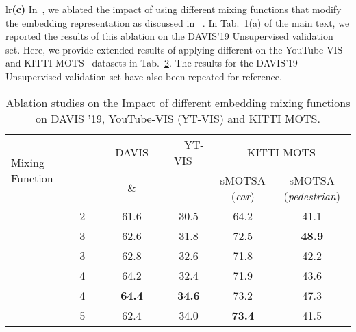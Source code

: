 \documentclass[runningheads]{llncs}
\begin{document}
\begin{table}[t]
\begin{subtable}[t]{0.36\linewidth}
{\begin{tabular}[t]{lr}{\scriptsize\textbf{(c)}}
In~\secAblations, we ablated the impact of using different mixing functions  that modify the embedding representation as discussed in ~\secEmbeddingRepresentation. In Tab.~1(a) of the main text, we reported the results of this ablation on the DAVIS'19 Unsupervised validation set. Here, we provide extended results of applying different  on the YouTube-VIS~\cite{Yang19ICCV} and KITTI-MOTS~\cite{Voigtlaender19CVPR} datasets in Tab.~\ref{tab:ablation_supplementary}. The results for the DAVIS'19 Unsupervised validation set have also been repeated for reference.
\begin{table}[t]
    \centering
    \footnotesize
    \vspace{-2mm}
                \begin{tabular}[t]{p{2.5cm} | c | c | c | c | c}
\toprule
            \multirow{2}{2.5cm}{{\footnotesize Mixing Function}} & \multirow{2}{0.5cm}{~~~~} & ~~DAVIS~~  & ~~YT-VIS~~ & \multicolumn{2}{c}{KITTI MOTS} \\
            \cmidrule(lr){3-6}
              && \& &  & sMOTSA (\textit{car}) & sMOTSA (\textit{pedestrian}) \\
            \cmidrule(lr){1-6}
                               & 2  & 61.6 & 30.5 & 64.2 & 41.1 \\
                              & 3   & 62.6  & 31.8 & 72.5 & \textbf{48.9} \\
                              & 3   & 62.8  & 32.6 & 71.8 & 42.2 \\
                              & 4  & 64.2  & 32.4 & 71.9 & 43.6 \\
                              & 4   & \textbf{64.4} & \textbf{34.6} & 73.2 & 47.3 \\
                             & 5 & 62.4   & 34.0 & \textbf{73.4} & 41.5 \\
            \bottomrule
            \end{tabular}
            \label{tab:ablation_embeddings_supplementary}
        \caption{Ablation studies on the Impact of different embedding mixing functions on DAVIS '19, YouTube-VIS (YT-VIS) and KITTI MOTS.}
        \label{tab:ablation_supplementary}
\end{table} 

\end{tabular}}
\end{subtable}
\end{table}
\end{document}
